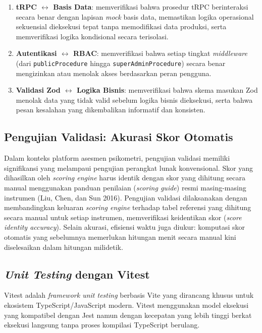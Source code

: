 \begin{enumerate}[leftmargin=2cm]
  \item \textbf{tRPC $\leftrightarrow$ Basis Data}: memverifikasi bahwa prosedur tRPC berinteraksi secara benar dengan lapisan \textit{mock} basis data, memastikan logika operasional sekuensial dieksekusi tepat tanpa memodifikasi data produksi, serta memverifikasi logika kondisional secara terisolasi.
  \item \textbf{Autentikasi $\leftrightarrow$ RBAC}: memverifikasi bahwa setiap tingkat \textit{middleware} (dari \texttt{publicProcedure} hingga \texttt{superAdminProcedure}) secara benar mengizinkan atau menolak akses berdasarkan peran pengguna.
  \item \textbf{Validasi Zod $\leftrightarrow$ Logika Bisnis}: memverifikasi bahwa skema masukan Zod menolak data yang tidak valid sebelum logika bisnis dieksekusi, serta bahwa pesan kesalahan yang dikembalikan informatif dan konsisten.
\end{enumerate}

\subsection{Pengujian Validasi: Akurasi Skor Otomatis}
\label{subsec:validation-testing}

Dalam konteks platform asesmen psikometri, pengujian validasi memiliki signifikansi yang melampaui pengujian perangkat lunak konvensional. Skor yang dihasilkan oleh \textit{scoring engine} harus identik dengan skor yang dihitung secara manual menggunakan panduan penilaian (\textit{scoring guide}) resmi masing-masing instrumen (Liu, Chen, dan Sun 2016). Pengujian validasi dilaksanakan dengan membandingkan keluaran \textit{scoring engine} terhadap tabel referensi yang dihitung secara manual untuk setiap instrumen, memverifikasi keidentikan skor (\textit{score identity accuracy}). Selain akurasi, efisiensi waktu juga diukur: komputasi skor otomatis yang sebelumnya memerlukan hitungan menit secara manual kini diselesaikan dalam hitungan milidetik.

\subsection{\textit{Unit Testing} dengan Vitest}
\label{subsec:vitest}

Vitest adalah \textit{framework unit testing} berbasis Vite yang dirancang khusus untuk ekosistem TypeScript/JavaScript modern. Vitest menggunakan model eksekusi yang kompatibel dengan Jest namun dengan kecepatan yang lebih tinggi berkat eksekusi langsung tanpa proses kompilasi TypeScript berulang.

